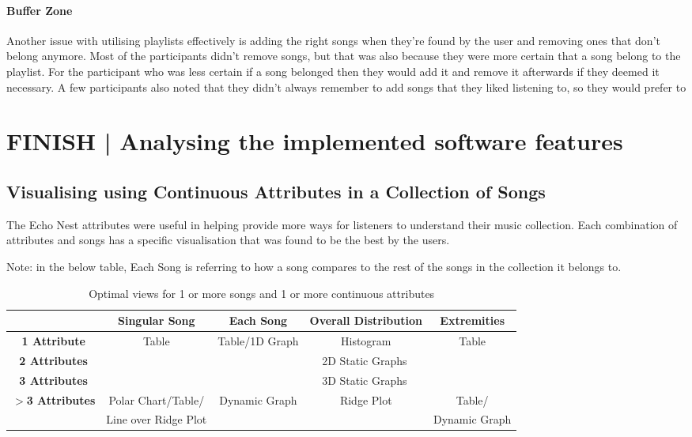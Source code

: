 \paragraph{Buffer Zone}
Another issue with utilising playlists effectively is adding the right songs when they're found by the user and removing ones that don't belong anymore. Most of the participants didn't remove songs, but that was also because they were more certain that a song belong to the playlist. For the participant who was less certain if a song belonged then they would add it and remove it afterwards if they deemed it necessary. A few participants also noted that they didn't always remember to add songs that they liked listening to, so they would prefer to 

\section{FINISH | Analysing the implemented software features}%

\subsection{Visualising using Continuous Attributes in a Collection of Songs}
The Echo Nest attributes were useful in helping provide more ways for listeners to understand their music collection. Each combination of attributes and songs has a specific visualisation that was found to be the best by the users.

Note: in the below table, Each Song is referring to how a song compares to the rest of the songs in the collection it belongs to.

\begin{longtable}[c]{| c | c | c | c | c|}
    \caption{Optimal views for 1 or more songs and 1 or more continuous attributes} \\
    \toprule
    & \textbf{Singular Song}
    & \textbf{Each Song} %
    & \textbf{Overall Distribution}
    & \textbf{Extremities} %
    \\ \midrule \endhead

    \textbf{1 Attribute} & \multirow{3}{*}{Table} & Table/1D Graph & Histogram & Table \\*
    \cmidrule{1-1}\cmidrule{3-5}
    \textbf{2 Attributes} & & \multicolumn{3}{c|}{2D Static Graphs} \\*
    \cmidrule{1-1}\cmidrule{3-5}
    \textbf{3 Attributes} & & \multicolumn{3}{c|}{3D Static Graphs} \\*
    \midrule
    \multirow{2}{*}{\textbf{\(>\)3 Attributes}} & Polar Chart/Table/ & \multirow{2}{*}{Dynamic Graph} & \multirow{2}{*}{Ridge Plot} & Table/\\*
    & Line over Ridge Plot & & & Dynamic Graph \\*
    \midrule
\end{longtable}

